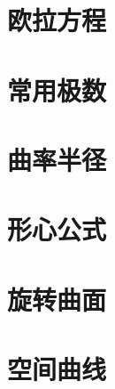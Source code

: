 ﻿\documentclass[a4paper,12pt,UTF8]{ctexart}
\begin{document}
    \section{欧拉方程}

    \section{常用极数}

    \section{曲率半径}

    \section{形心公式}

    \section{旋转曲面}

    \section{空间曲线}
\end{document}
